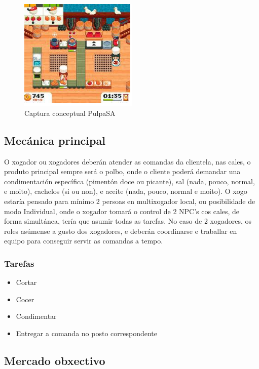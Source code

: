 \documentclass{report}  %
\begin{document}
\begin{figure}[h]
    \centering
    \includegraphics[width=0.5\textwidth]{images/concept_game.png}
    \caption{Captura conceptual PulpaSA}
    \label{fig:Captura conceptual PulpaSA}
\end{figure}

\newpage

\subsection{Mecánica principal}
O xogador ou xogadores deberán atender as comandas da clientela, nas cales, 
o produto principal sempre será o polbo, onde o cliente poderá demandar una 
condimentación específica (pimentón doce ou picante), sal (nada, pouco, 
normal, e moito), cachelos (si ou non), e aceite (nada, pouco, normal e moito). 
O xogo estaría pensado para mínimo 2 persoas en multixogador local, ou 
posibilidade de modo Individual, onde o xogador tomará o control de 2 NPC’s 
cos cales, de forma simultánea, tería que asumir todas as tarefas. No caso de 
2 xogadores, os roles asúmense a gusto dos xogadores, e deberán 
coordinarse e traballar en equipo para conseguir servir as comandas a tempo. 

\subsubsection{Tarefas}
\begin{itemize}
    \item Cortar
    \item Cocer
    \item Condimentar
    \item Entregar a comanda no posto correspondente
\end{itemize}

\subsection{Mercado obxectivo}
\end{document}
